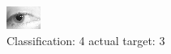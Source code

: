 \begin{figure}[h!]
\begin{center}
\includegraphics[width=0.60\columnwidth]{figures/ID1362_class_4_target_3.png}
\end{center}
\caption{ Classification: 4 actual target: 3}
\label{fig:ID1362_class_4_target_3}
\end{figure}
